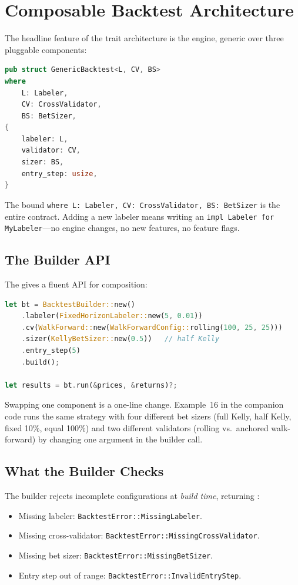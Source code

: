 \section{Composable Backtest Architecture}

The headline feature of the trait architecture is the 
engine, generic over three pluggable components:

\begin{lstlisting}[language=Rust]
pub struct GenericBacktest<L, CV, BS>
where
    L: Labeler,
    CV: CrossValidator,
    BS: BetSizer,
{
    labeler: L,
    validator: CV,
    sizer: BS,
    entry_step: usize,
}
\end{lstlisting}

The bound \texttt{where L: Labeler, CV: CrossValidator, BS: BetSizer}
is the entire contract. Adding a new labeler means writing an
\texttt{impl Labeler for MyLabeler}---no engine changes, no new
features, no feature flags.

\subsection{The Builder API}

The  gives a fluent API for composition:

\begin{lstlisting}[language=Rust]
let bt = BacktestBuilder::new()
    .labeler(FixedHorizonLabeler::new(5, 0.01))
    .cv(WalkForward::new(WalkForwardConfig::rolling(100, 25, 25)))
    .sizer(KellyBetSizer::new(0.5))   // half Kelly
    .entry_step(5)
    .build();

let results = bt.run(&prices, &returns)?;
\end{lstlisting}

Swapping one component is a one-line change. Example~16 in the
companion code runs the same strategy with four different bet sizers
(full Kelly, half Kelly, fixed 10\%, equal 100\%) and two different
validators (rolling vs.\ anchored walk-forward) by changing one
argument in the builder call.

\subsection{What the Builder Checks}

The builder rejects incomplete configurations at \emph{build time},
returning :

\begin{itemize}
    \item Missing labeler: \texttt{BacktestError::MissingLabeler}.
    \item Missing cross-validator: \texttt{BacktestError::MissingCrossValidator}.
    \item Missing bet sizer: \texttt{BacktestError::MissingBetSizer}.
    \item Entry step out of range: \texttt{BacktestError::InvalidEntryStep}.
\end{itemize}

